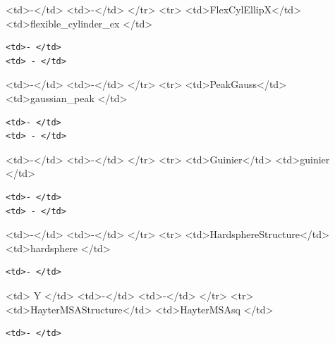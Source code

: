 \textless{}td\textgreater{}-\textless{}/td\textgreater{} \textless{}td\textgreater{}-\textless{}/td\textgreater{} \textless{}/tr\textgreater{} \textless{}tr\textgreater{} \textless{}td\textgreater{}FlexCylEllipX\textless{}/td\textgreater{} \textless{}td\textgreater{}flexible\_cylinder\_ex \textless{}/td\textgreater{}

\begin{verbatim}
<td>- </td>
<td> - </td>
\end{verbatim}

\textless{}td\textgreater{}-\textless{}/td\textgreater{} \textless{}td\textgreater{}-\textless{}/td\textgreater{} \textless{}/tr\textgreater{} \textless{}tr\textgreater{} \textless{}td\textgreater{}PeakGauss\textless{}/td\textgreater{} \textless{}td\textgreater{}gaussian\_peak \textless{}/td\textgreater{}

\begin{verbatim}
<td>- </td>
<td> - </td>
\end{verbatim}

\textless{}td\textgreater{}-\textless{}/td\textgreater{} \textless{}td\textgreater{}-\textless{}/td\textgreater{} \textless{}/tr\textgreater{} \textless{}tr\textgreater{} \textless{}td\textgreater{}Guinier\textless{}/td\textgreater{} \textless{}td\textgreater{}guinier \textless{}/td\textgreater{}

\begin{verbatim}
<td>- </td>
<td> - </td>
\end{verbatim}

\textless{}td\textgreater{}-\textless{}/td\textgreater{} \textless{}td\textgreater{}-\textless{}/td\textgreater{} \textless{}/tr\textgreater{} \textless{}tr\textgreater{} \textless{}td\textgreater{}HardsphereStructure\textless{}/td\textgreater{} \textless{}td\textgreater{}hardsphere \textless{}/td\textgreater{}

\begin{verbatim}
<td>- </td>
\end{verbatim}

\textless{}td\textgreater{} Y \textless{}/td\textgreater{} \textless{}td\textgreater{}-\textless{}/td\textgreater{} \textless{}td\textgreater{}-\textless{}/td\textgreater{} \textless{}/tr\textgreater{} \textless{}tr\textgreater{} \textless{}td\textgreater{}HayterMSAStructure\textless{}/td\textgreater{} \textless{}td\textgreater{}HayterMSAsq \textless{}/td\textgreater{}

\begin{verbatim}
<td>- </td>
\end{verbatim}

